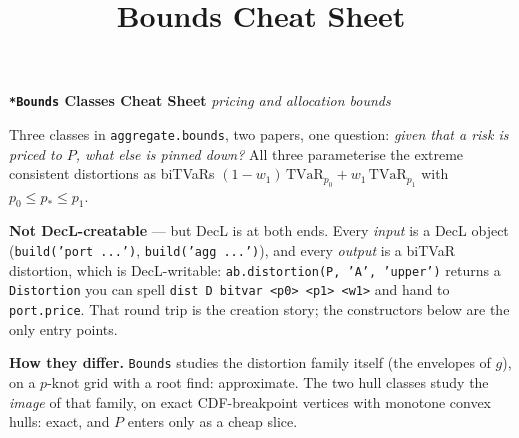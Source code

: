 %
%
%


\title{Bounds Cheat Sheet}





{\huge{\textbf{\texttt{*Bounds} Classes Cheat Sheet}}} \hfill {\large\it pricing and allocation bounds}

\raggedright
\smallskip
Three classes in \texttt{aggregate.bounds}, two papers, one question: {\it given that a risk is priced to $P$, what else is pinned down?} All three parameterise the extreme consistent distortions as biTVaRs $(1-w_1)\,\mathrm{TVaR}_{p_0} + w_1\,\mathrm{TVaR}_{p_1}$ with $p_0 \le p_\ast \le p_1$.

\smallskip
{\bf Not DecL-creatable} --- but DecL is at both ends. Every {\it input} is a DecL object (\texttt{build('port ...')}, \texttt{build('agg ...')}), and every {\it output} is a biTVaR distortion, which is DecL-writable: \texttt{ab.distortion(P, 'A', 'upper')} returns a \texttt{Distortion} you can spell \texttt{dist D bitvar <p0> <p1> <w1>} and hand to \texttt{port.price}. That round trip is the creation story; the constructors below are the only entry points.

\smallskip
{\bf How they differ.} \texttt{Bounds} studies the distortion family itself (the envelopes of $g$), on a $p$-knot grid with a root find: approximate. The two hull classes study the {\it image} of that family, on exact CDF-breakpoint vertices with monotone convex hulls: exact, and $P$ enters only as a cheap slice.

